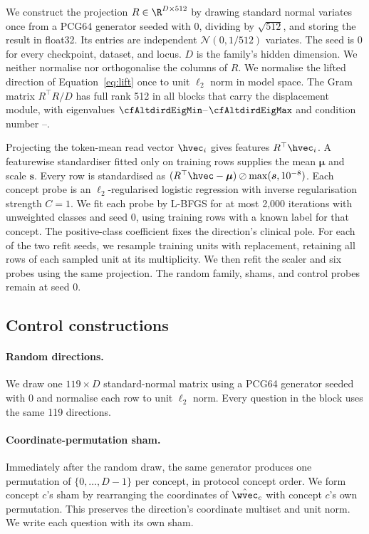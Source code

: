 \documentclass{article}
\providecommand{\DIFaddtex}[1]{{\protect\color{blue}\uwave{#1}}} %
\providecommand{\DIFaddbegin}{} %
\providecommand{\DIFaddend}{} %
\providecommand{\DIFadd}[1]{\texorpdfstring{\DIFaddtex{#1}}{#1}} %
\providecommand{\DIFaddincludegraphics}[2][]{{\color{blue}\fbox{\DIFOincludegraphics[#1]{#2}}}} %
\DeclareRobustCommand{\DIFaddbegin}{\DIFOaddbegin \let\includegraphics\DIFaddincludegraphics} %
\DeclareRobustCommand{\DIFaddend}{\DIFOaddend \let\includegraphics\DIFOincludegraphics} %
\begin{document}
We construct the projection $R\in\R^{D\times512}$ by drawing standard normal variates once from a PCG64 generator seeded with $0$, dividing by $\sqrt{512}$, and storing the result in float32. Its entries are independent $\mathcal{N}(0,1/512)$ variates. The seed is $0$ for every checkpoint, dataset, and locus. $D$ is the family's hidden dimension. We neither normalise nor orthogonalise the columns of $R$. We normalise the lifted direction of Equation~\ref{eq:lift} once to unit $\ell_2$ norm in model space. The Gram matrix $R^{\top}R/D$ has full rank 512 in all \cfAltdirdBlocks{} blocks that carry the displacement module, with eigenvalues $\cfAltdirdEigMin$--$\cfAltdirdEigMax$ and condition number \cfAltdirdCondMin{}--\cfAltdirdCondMax{}.

Projecting the token-mean read vector $\hvec_i$ gives features $R^{\top}\hvec_i$. A featurewise standardiser fitted only on training rows supplies the mean $\boldsymbol\mu$ and scale $\boldsymbol s$. Every row is standardised as $(R^{\top}\hvec-\boldsymbol\mu)\oslash\max(\boldsymbol s,10^{-8})$\DIFaddbegin \DIFadd{, where $\oslash$ and $\max$ act elementwise}\DIFaddend . Each concept probe is an $\ell_2$-regularised logistic regression with inverse regularisation strength $C=1$. We fit each probe by L-BFGS for at most 2{,}000 iterations with unweighted classes and seed $0$, using training rows with a known label for that concept. The positive-class coefficient fixes the direction's clinical pole. For each of the two refit seeds, we resample training units with replacement, retaining all rows of each sampled unit at its multiplicity. We then refit the scaler and six probes using the same projection. The random family, shams, and control probes remain at seed 0.

\subsection{Control constructions}
\label{app:repro-controls}

\paragraph{Random directions.} We draw one $119\times D$ standard-normal matrix using a PCG64 generator seeded with $0$ and normalise each row to unit $\ell_2$ norm. Every question in the block uses the same 119 directions.

\paragraph{Coordinate-permutation sham.} Immediately after the random draw, the same generator produces one permutation of $\{0,\dots,D{-}1\}$ per concept, in protocol concept order. We form concept $c$'s sham by rearranging the coordinates of $\hat\wvec_c$ with concept $c$'s own permutation. This preserves the direction's coordinate multiset and unit norm. We write each question with its own sham.
\end{document}
